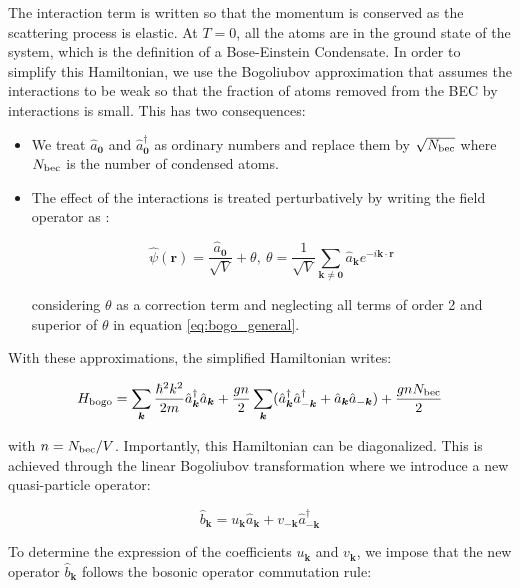 \noindent The interaction term is written so that the momentum is conserved as the scattering process is elastic. At $T=0$, all the atoms are in the ground state of the system, which is the definition of a Bose-Einstein Condensate. In order to simplify this Hamiltonian, we use the Bogoliubov approximation that assumes the interactions to be weak so that the fraction of atoms removed from the BEC by interactions is small. This has two consequences:

\begin{itemize}
    \item We treat $\hat{a}_{\bm{0}}$ and $\hat{a}^{\dagger}_{\bm{0}}$ as ordinary numbers and replace them by $\sqrt{N_{\rm{bec}}}$ where $N_{\rm{bec}}$ is the number of condensed atoms. 
    \item The effect of the interactions is treated perturbatively by writing the field operator as \cite{bogoliubov1947}:
    
    \begin{equation}
        \hat{\psi}(\bm{r}) = \frac{\hat{a}_{\bm{0}}}{\sqrt{V}} + \theta, \ \theta = \frac{1}{\sqrt{V}}  \sum_{\bm{k} \neq \bm{0}} \hat{a}_{\bm{k}} e^{-i \bm{k} \cdot \bm{r}}
    \end{equation}
    
    considering $\theta$ as a correction term and neglecting all terms of order 2 and superior of $\theta$ in equation \ref{eq:bogo_general}. 
    
\end{itemize}

\noindent With these approximations, the simplified Hamiltonian writes:

\begin{equation}
    H_{\rm{bogo}}=\sum_{\bm{k}}\frac{\hbar^2 k^2}{2m} \hat{a}^{\dagger}_{\bm{k}}  \hat{a}_{\bm{k}} +  \frac{gn}{2} \sum_{\bm{k}} (\hat{a}^{\dagger}_{\bm{k}} \hat{a}^{\dagger}_{-\bm{k}} +\hat{a}_{\bm{k}} \hat{a}_{-\bm{k}})+\frac{gnN_{\rm{bec}}}{2}
\end{equation}

\noindent with $n=N_{\rm{bec}}/V$. Importantly, this Hamiltonian can be diagonalized. This is achieved through the linear Bogoliubov transformation where we introduce a new quasi-particle operator:

\begin{equation}
    \hat{b}_{\bm{k}}=u_{\bm{k}} \hat{a}_{\bm{k}} + v_{-\bm{k}} \hat{a}^{\dagger}_{-\bm{k}}
\end{equation}

\noindent To determine the expression of the coefficients $u_{\bm{k}}$ and $v_{\bm{k}}$, we impose that the new operator $\hat{b}_{\bm{k}}$ follows the bosonic operator commutation rule:

